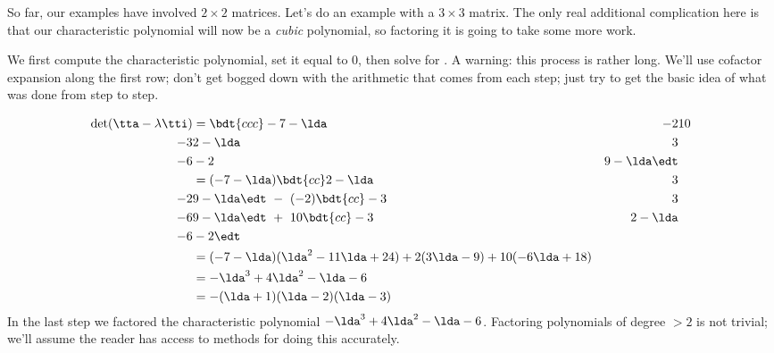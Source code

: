 So far, our examples have involved $2\times 2$ matrices. Let's do an example with a $3\times 3$ matrix. The only real additional complication here is that our characteristic polynomial will now be a \textit{cubic} polynomial, so factoring it is going to take some more work.

\medskip

{We first compute the characteristic polynomial, set it equal to 0, then solve for \lda. A warning: this process is rather long. We'll use cofactor expansion along the first row; don't get bogged down with the arithmetic that comes from each step; just try to get the basic idea of what was done from step to step.



\begin{align*}
\det(\tta-\lambda\tti) &= \bdt{ccc} -7-\lda & -2 & 10 \\-3 & 2-\lda & 3\\ -6 & -2 & 9-\lda \edt \\
										&= (-7-\lda)\bdt{cc}2-\lda & 3\\-2 & 9-\lda\edt\ -\ (-2)\bdt{cc} -3&3\\-6 & 9-\lda \edt\ +\ 10\bdt{cc} -3&2-\lda \\-6 & -2 \edt \\
										&= (-7-\lda)(\lda^2-11\lda + 24) + 2(3\lda-9)+10(-6\lda+18)\\
										&= -\lda^3+4\lda^2-\lda -6\\
										&= -(\lda + 1)(\lda-2)(\lda-3)
\end{align*}
In the last step we factored the characteristic polynomial $-\lda^3+4\lda^2-\lda -6$. Factoring polynomials of degree $>2$ is not trivial; we'll assume the reader has access to methods for doing this accurately. 

}
